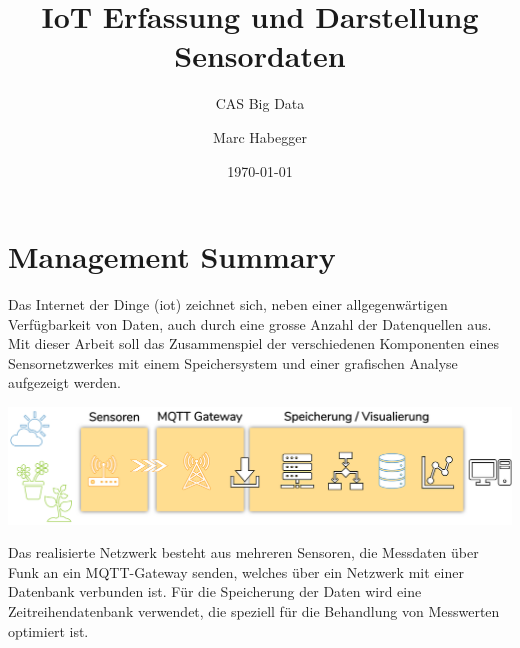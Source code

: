 \documentclass[
  12pt, %
  a4paper, %
  oneside, %
  openany, 
  numbers=noenddot, %
  BCOR=5mm, %
  parskip=half*, %
  thesis, %
]{bfhbook}
\author{Marc Habegger}
\title{IoT Erfassung und Darstellung Sensordaten}
\subtitle{CAS Big Data}
\date{\today} %
\begin{document}
\maketitle

\tableofcontents
\sloppy
\mainmatter %
\chapter*{Management Summary}
Das Internet der Dinge (\Gls{iot}) zeichnet sich, neben einer allgegenwärtigen Verfügbarkeit von Daten, auch durch eine grosse Anzahl der Datenquellen aus. Mit dieser Arbeit soll das Zusammenspiel der verschiedenen Komponenten eines Sensornetzwerkes mit einem Speichersystem und einer grafischen Analyse aufgezeigt werden.

  \begin{center}\label{overview}
    \includegraphics[width=18cm, left]{Bilder/Overview.png}
     \captionsetup{justification=centering}
  \end{center}
   
Das realisierte Netzwerk besteht aus mehreren Sensoren, die Messdaten über Funk an ein MQTT-Gateway senden, welches über ein Netzwerk mit einer Datenbank verbunden ist. Für die Speicherung der Daten wird eine Zeitreihendatenbank verwendet, die speziell für die Behandlung von Messwerten optimiert ist.
\end{document}
